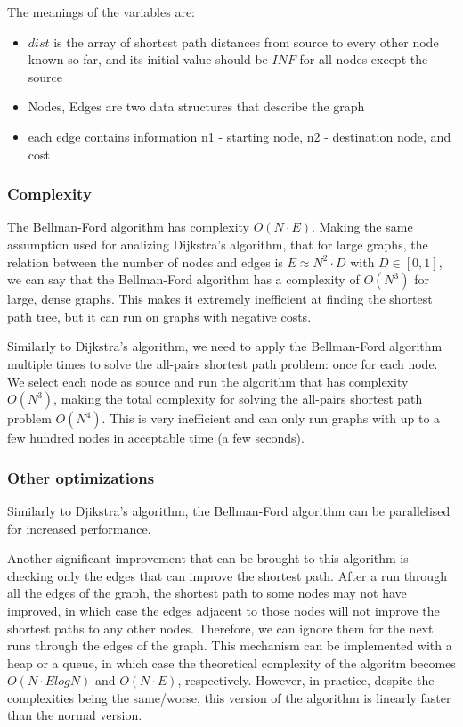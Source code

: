 \documentclass[runningheads]{llncs}
\begin{document}
The meanings of the variables are:
\begin{itemize}
	\item $dist$ is the array of shortest path distances from source to every other node known so far, and its initial value should be $INF$ for all nodes except the source
	\item Nodes, Edges are two data structures that describe the graph
	\item each edge contains information n1 - starting node, n2 - destination node, and cost
\end{itemize}

\subsubsection{Complexity}
The Bellman-Ford algorithm has complexity $O(N \cdot E)$. Making the same assumption used for analizing Dijkstra's algorithm, that for large graphs, the relation between the number of nodes and edges is $E \approx N^2 \cdot D$ with $D \in [0,1]$, we can say that the Bellman-Ford algorithm has a complexity of $O(N^3)$ for large, dense graphs. This makes it extremely inefficient at finding the shortest path tree, but it can run on graphs with negative costs.

Similarly to Dijkstra's algorithm, we need to apply the Bellman-Ford algorithm multiple times to solve the all-pairs shortest path problem: once for each node. We select each node as source and run the algorithm that has complexity $O(N^3)$, making the total complexity for solving the all-pairs shortest path problem $O(N^4)$. This is very inefficient and can only run graphs with up to a few hundred nodes in acceptable time (a few seconds).

\subsubsection{Other optimizations}
Similarly to Djikstra's algorithm, the Bellman-Ford algorithm can be parallelised for increased performance.

Another significant improvement that can be brought to this algorithm is checking only the edges that can improve the shortest path. After a run through all the edges of the graph, the shortest path to some nodes may not have improved, in which case the edges adjacent to those nodes will not improve the shortest paths to any other nodes. Therefore, we can ignore them for the next runs through the edges of the graph. This mechanism can be implemented with a heap or a queue, in which case the theoretical complexity of the algoritm becomes $O(N \cdot ElogN)$ and $O(N \cdot E)$, respectively\cite{ref_url_IABF}. However, in practice, despite the complexities being the same/worse, this version of the algorithm is linearly faster than the normal version.
\end{document}
